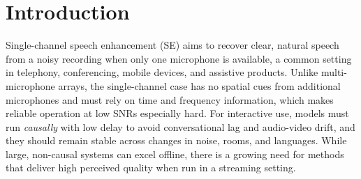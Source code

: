 \documentclass[final,5p,times,authoryear]{elsarticle}
\begin{document}

\section{Introduction}
\label{sec:intro}

Single-channel speech enhancement (SE) aims to recover clear, natural speech from a noisy recording when only one microphone is available, a common setting in telephony, conferencing, mobile devices, and assistive products. Unlike multi-microphone arrays, the single-channel case has no spatial cues from additional microphones and must rely on time and frequency information, which makes reliable operation at low SNRs especially hard. For interactive use, models must run \emph{causally} with low delay to avoid conversational lag and audio-video drift, and they should remain stable across changes in noise, rooms, and languages. While large, non-causal systems can excel offline, there is a growing need for methods that deliver high perceived quality when run in a streaming setting.
\end{document}
